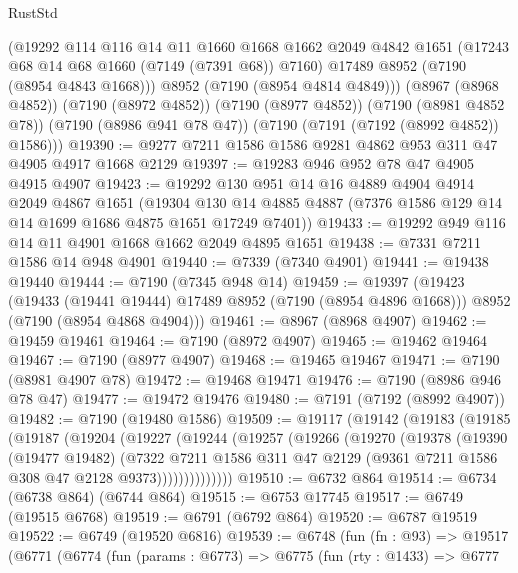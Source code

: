 \begin{lexlean}{RustStd}
\begin{coremodule}
        (@19292
          @114
          @116
          @14
          @11
          @1660
          @1668
          @1662
          @2049
          @4842
          @1651
          (@17243 @68 @14 @68 @1660 (@7149 (@7391 @68)) @7160)
          @17489
          @8952
          (@7190 (@8954 @4843 @1668)))
        @8952
        (@7190 (@8954 @4814 @4849)))
      (@8967 (@8968 @4852))
      (@7190 (@8972 @4852))
      (@7190 (@8977 @4852))
      (@7190 (@8981 @4852 @78))
      (@7190 (@8986 @941 @78 @47))
      (@7190 (@7191 (@7192 (@8992 @4852)) @1586)))
@19390 := @9277 @7211 @1586 @1586 @9281 @4862 @953 @311 @47 @4905 @4917 @1668 @2129
@19397 := @19283 @946 @952 @78 @47 @4905 @4915 @4907
@19423 := @19292
    @130
    @951
    @14
    @16
    @4889
    @4904
    @4914
    @2049
    @4867
    @1651
    (@19304 @130 @14 @4885 @4887 (@7376 @1586 @129 @14 @14 @1699 @1686 @4875 @1651 @17249 @7401))
@19433 := @19292 @949 @116 @14 @11 @4901 @1668 @1662 @2049 @4895 @1651
@19438 := @7331 @7211 @1586 @14 @948 @4901
@19440 := @7339 (@7340 @4901)
@19441 := @19438 @19440
@19444 := @7190 (@7345 @948 @14)
@19459 := @19397
    (@19423
      (@19433 (@19441 @19444) @17489 @8952 (@7190 (@8954 @4896 @1668)))
      @8952
      (@7190 (@8954 @4868 @4904)))
@19461 := @8967 (@8968 @4907)
@19462 := @19459 @19461
@19464 := @7190 (@8972 @4907)
@19465 := @19462 @19464
@19467 := @7190 (@8977 @4907)
@19468 := @19465 @19467
@19471 := @7190 (@8981 @4907 @78)
@19472 := @19468 @19471
@19476 := @7190 (@8986 @946 @78 @47)
@19477 := @19472 @19476
@19480 := @7191 (@7192 (@8992 @4907))
@19482 := @7190 (@19480 @1586)
@19509 := @19117
    (@19142
      (@19183
        (@19185
          (@19187
            (@19204
              (@19227
                (@19244
                  (@19257
                    (@19266
                      (@19270
                        (@19378
                          (@19390
                            (@19477 @19482)
                            (@7322
                              @7211
                              @1586
                              @311
                              @47
                              @2129
                              (@9361 @7211 @1586 @308 @47 @2128 @9373))))))))))))))
@19510 := @6732 @864
@19514 := @6734 (@6738 @864) (@6744 @864)
@19515 := @6753 @17745
@19517 := @6749 (@19515 @6768)
@19519 := @6791 (@6792 @864)
@19520 := @6787 @19519
@19522 := @6749 (@19520 @6816)
@19539 := @6748
    (fun (fn : @93) =>
    @19517
      (@6771
        (@6774
          (fun (params : @6773) =>
          @6775
            (fun (rty : @1433) =>
            @6777

\end{coremodule}
\end{lexlean}
